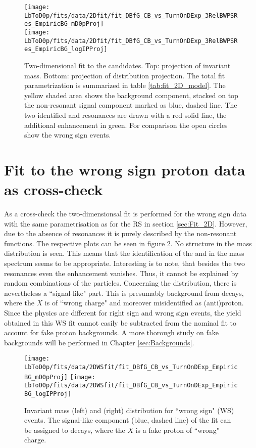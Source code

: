 \begin{figure}[hptb]
	\centering
	\texttt{[image: LbToD0p/fits/data/2Dfit/fit\_DBfG\_CB\_vs\_TurnOnDExp\_3RelBWPSRes\_EmpiricBG\_mD0pProj]} \\
	\texttt{[image: LbToD0p/fits/data/2Dfit/fit\_DBfG\_CB\_vs\_TurnOnDExp\_3RelBWPSRes\_EmpiricBG\_logIPProj]}
	\caption{Two-dimensional fit to the \LbToDpmunuX candidates. Top: projection of invariant \Dz\proton mass. Bottom: projection of \logIP distribution projection. 
             The total fit parametrization is summarized in table \ref{tab:fit_2D_model}.
             The yellow shaded area shows the background component, stacked on top the non-resonant signal component marked as blue, dashed line.
             The two identified \LcResI and \LcResII resonances are drawn with a red solid line, the additional enhancement in green.
             For comparison the open circles show the wrong sign events.}
	\label{fig:fit2D}
\end{figure}


\section{Fit to the wrong sign proton data as cross-check}

As a cross-check the two-dimensionsal fit is performed for the wrong sign data with the same parametrisation as for the RS in section \ref{sec:Fit_2D}.
However, due to the absence of resonances it is purely described by the non-resonant functions.
The respective plots can be seen in figure \ref{fig:fit_2D_WS}. 
No structure in the mass distribution is seen. 
This means that the identification of the \LcResI and \LcResII in the \Dz\proton mass spectrum seems to be appropriate.
Interesting is to note, that besides the two resonances even the enhancement vanishes.
Thus, it cannot be explained by random combinations of the particles.
Concerning the \logIP distribution, there is nevertheless a ``signal-like" part. 
This is presumably background from \BToDmunuX decays, where the $X$ is of ``wrong charge" and moreover misidentified as (anti)proton.
Since the physics are different for right sign and wrong sign events, the yield obtained in this WS fit cannot easily be subtracted from the nominal fit to account for fake proton backgrounds.
A more thorough study on fake backgrounds will be performed in Chapter \ref{sec:Backgrounds}.
\begin{figure}[hptb]
	\centering
	\texttt{[image: LbToD0p/fits/data/2DWSfit/fit\_DBfG\_CB\_vs\_TurnOnDExp\_EmpiricBG\_mD0pProj]}
	\texttt{[image: LbToD0p/fits/data/2DWSfit/fit\_DBfG\_CB\_vs\_TurnOnDExp\_EmpiricBG\_logIPProj]}
	\caption{Invariant \Dz\proton mass (left) and \logIP (right) distribution for ``wrong sign" (WS) events.
             The signal-like component (blue, dashed line) of the fit can be assigned to \BToDmunuX decays, where the $X$ is a fake proton of ``wrong" charge.}
	\label{fig:fit_2D_WS}
\end{figure}


